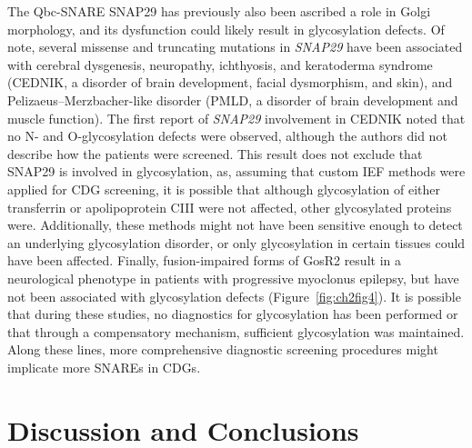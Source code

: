 The Qbc-SNARE SNAP29 has previously also been ascribed a role in Golgi morphology, and its dysfunction could likely result in glycosylation defects\cite{morelli_multiple_2014}. Of note, several missense and truncating mutations in \emph{SNAP29} have been associated with cerebral dysgenesis, neuropathy, ichthyosis, and keratoderma syndrome (CEDNIK, a disorder of brain development, facial dysmorphism, and skin), and Pelizaeus–Merzbacher-like disorder (PMLD, a disorder of brain development and muscle function)\cite{hsu_cednik_2017,llaci_compound_2019,poojary_cednik_2019,mcdonald-mcginn_hemizygous_2013,zhang_genetic_2009,sprecher_mutation_2005,fuchstelem_cednik_2011}. The first report of \emph{SNAP29} involvement in CEDNIK noted that no N- and O-glycosylation defects were observed, although the authors did not describe how the patients were screened\cite{sprecher_mutation_2005}. This result does not exclude that SNAP29 is involved in glycosylation, as, assuming that custom IEF methods were applied for CDG screening, it is possible that although glycosylation of either transferrin or apolipoprotein CIII were not affected, other glycosylated proteins were. Additionally, these methods might not have been sensitive enough to detect an underlying glycosylation disorder, or only glycosylation in certain tissues could have been affected. Finally, fusion-impaired forms of GosR2 result in a neurological phenotype in patients with progressive myoclonus epilepsy, but have not been associated with glycosylation defects (Figure~\ref{fig:ch2fig4})\cite{praschberger_mutations_2017,praschberger_expanding_2015,corbett_mutation_2011}. It is possible that during these studies, no diagnostics for glycosylation has been performed or that through a compensatory mechanism, sufficient glycosylation was maintained. Along these lines, more comprehensive diagnostic screening procedures might implicate more SNAREs in CDGs.

\clearpage

\section{Discussion and Conclusions}


